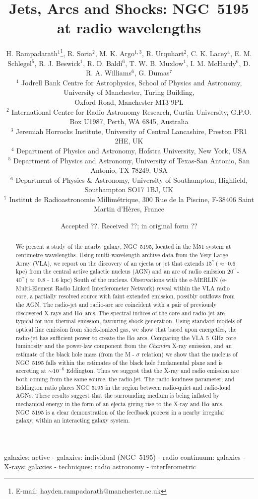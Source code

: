 \documentclass[fleqn,usenatbib]{mnras}
\title{Jets, Arcs and Shocks: NGC~5195 at radio wavelengths}
\author[H. Rampadarath et al]{H. Rampadarath$^{1}$\thanks{E-mail: hayden.rampadarath@manchester.ac.uk}, R. Soria$^{2}$, M. K. Argo$^{1,3}$, R. Urquhart$^{2}$, C. K. Lacey$^{4}$, 
\newauthor
E. M. Schlegel$^{5}$, R. J. Beswick$^{1}$,  R. D. Baldi$^{6}$, T. W. B. Muxlow$^{1}$, I. M. McHardy$^{6}$,
\newauthor
D. R. A. Williams$^{6}$, G. Dumas$^{7}$ \\
$^{1}$ Jodrell Bank Centre for Astrophysics, School of Physics and Astronomy, University of Manchester, Turing Building, \\ Oxford Road, Manchester M13 9PL\\
$^{2}$ International Centre for Radio Astronomy Research, Curtin University, G.P.O. Box U1987, Perth, WA 6845, Australia\\
$^{3}$ Jeremiah Horrocks Institute, University of Central Lancashire, Preston PR1 2HE, UK\\
$^{4}$ Department of Physics and Astronomy, Hofstra University, New York, USA \\
$^{5}$ Department of Physics and Astronomy, University of Texas-San Antonio, San Antonio, TX 78249, USA\\
$^{6}$ Department of Physics $\&$ Astronomy, University of Southampton, Highfield, Southampton SO17 1BJ, UK\\
$^{7}$ Institut de Radioastronomie Millim\'{e}trique, 300 Rue de la Piscine, F-38406 Saint Martin d'Hères, France}
\def\arcs{$^{\prime\prime}\,$}
\begin{document}
\setlength{\parskip}{0pt}

\date{Accepted ??. Received ??; in original form ??}

\pagerange{\pageref{firstpage}--\pageref{lastpage}} 

\maketitle

\label{firstpage}

\begin{abstract}
We present a study of the nearby galaxy, NGC~5195, located in the M51 system at centimetre wavelengths. Using 
multi-wavelength archive data from the {Very Large Array (VLA)}, we report on the discovery of an ejecta or jet that extends 15\arcs ($\approx$ 0.6 kpc) from the central {active galactic nucleus (AGN)} and an arc of radio emission 20\arcs - 40\arcs ($\approx$ 0.8 - 1.6 kpc)  South of the nucleus.  Observations with the e-MERLIN (e-Multi-Element Radio Linked Interferometer Network) reveal within the VLA radio core, a partially resolved source with faint extended emission, possibly outflows from the AGN. The radio-jet and radio-arc are coincident with a pair of previously discovered X-rays and H$\alpha$ arcs. The spectral indices of the core and radio-jet are typical for non-thermal emission, favouring shock-generation. Using standard models of optical line emission from shock-ionized gas, we show that based upon energetics, the radio-jet has sufficient power to create the H$\alpha$ arcs. Comparing the VLA 5~GHz core luminosity and the power-law component from the \textit{Chandra} X-ray emission, and an estimate of the black hole mass (from the M - $\sigma$ relation) we show that the nucleus of NGC~5195 falls within the estimates of the black hole fundamental plane and is accreting at $\sim 10^{-6}$ Eddington. Thus we suggest that the X-ray and radio emission are both coming from the same source, the radio-jet. The radio loudness parameter, and Eddington ratio places NGC 5195 in the region between radio-quiet and radio-loud AGNs. These results suggest that the surrounding medium is being inflated by mechanical energy in the form of an ejecta giving rise to the X-ray and H$\alpha$ arcs. NGC~5195 is a clear demonstration of the feedback process in a nearby irregular galaxy, within an interacting galaxy system.

\end{abstract}

\begin{keywords}
galaxies: active - galaxies: individual (NGC~5195) - radio continuum: galaxies - X-rays: galaxies - techniques: radio astronomy - interferometric
\end{keywords}
\end{document}
